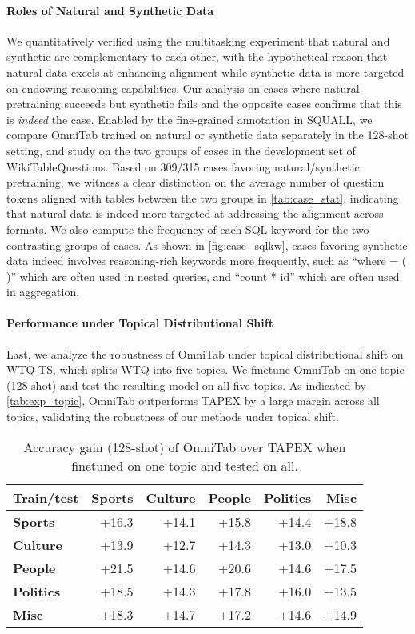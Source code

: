 \documentclass[11pt]{article}
\def\smallcol{\hskip 6pt}
\def\ours{OmniTab\xspace}
\def\wtq{WikiTableQuestions\xspace}
\def\squall{SQUALL\xspace}
\begin{document}
\paragraph{Roles of Natural and Synthetic Data}
We quantitatively verified using the multitasking experiment that natural and synthetic are complementary to each other, with the hypothetical reason that natural data excels at enhancing alignment while synthetic data is more targeted on endowing reasoning capabilities.
Our analysis on cases where natural pretraining succeeds but synthetic fails and the opposite cases confirms that this is \emph{indeed} the case.
Enabled by the fine-grained annotation in \squall \cite{shi-2020-squall}, we compare \ours trained on natural or synthetic data separately in the 128-shot setting, and study on the two groups of cases in the development set of \wtq.
Based on 309/315 cases favoring natural/synthetic pretraining, we witness a clear distinction on the average number of question tokens aligned with tables between the two groups in \autoref{tab:case_stat}, indicating that natural data is indeed more targeted at addressing the alignment across formats.
We also compute the frequency of each SQL keyword for the two contrasting groups of cases. As shown in \autoref{fig:case_sqlkw}, cases favoring synthetic data indeed involves reasoning-rich keywords more frequently, such as ``where = ( )'' which are often used in nested queries, and ``count * id'' which are often used in aggregation.

\paragraph{Performance under Topical Distributional Shift}
Last, we analyze the robustness of \ours under topical distributional shift on WTQ-TS, which splits WTQ into five topics.
We finetune \ours on one topic (128-shot) and test the resulting model on all five topics.
As indicated by \autoref{tab:exp_topic}, \ours outperforms TAPEX by a large margin across all topics, validating the robustness of our methods under topical shift.

\begin{table}
\small
\centering
\begin{tabular}{lr@{\smallcol}r@{\smallcol}r@{\smallcol}r@{\smallcol}r}
\toprule
\textbf{Train/test} & \textbf{Sports} & \textbf{Culture} & \textbf{People} & \textbf{Politics} & \textbf{Misc} \\
\midrule
\textbf{Sports} & +16.3 & +14.1 & +15.8 & +14.4 & +18.8 \\
\textbf{Culture} & +13.9 & +12.7 & +14.3 & +13.0 & +10.3 \\
\textbf{People} & +21.5 & +14.6 & +20.6 & +14.6 & +17.5 \\
\textbf{Politics} & +18.5 & +14.3 & +17.8 & +16.0 & +13.5 \\
\textbf{Misc} & +18.3 & +14.7 & +17.2 & +14.6 & +14.9 \\
\bottomrule
\end{tabular}
\caption{Accuracy gain (128-shot) of \ours over TAPEX when finetuned on one topic and tested on all.}
\label{tab:exp_topic}
\end{table}
\end{document}
